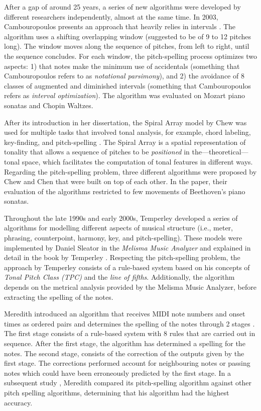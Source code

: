 After a gap of around 25 years, a series of new algorithms
were developed by different researchers independently,
almost at the same time. In 2003, Cambouropoulos presents an
approach that heavily relies in intervals
\cite{cambouropoulos2003pitch}. The algorithm uses a
shifting overlapping window (suggested to be of 9 to 12
pitches long). The window moves along the sequence of
pitches, from left to right, until the sequence concludes.
For each window, the pitch-spelling process optimizes two
aspects: 1) that notes make the minimum use of accidentals
(something that Cambouropoulos refers to as \emph{notational
parsimony}), and 2) the avoidance of 8 classes of augmented
and diminished intervals (something that Cambouropoulos
refers as \emph{interval optimization}). The algorithm was
evaluated on Mozart piano sonatas and Chopin Waltzes.

After its introduction in her dissertation, the Spiral Array
model by Chew was used for multiple tasks that involved
tonal analysis, for example, chord labeling, key-finding,
and pitch-spelling \cite{chew2000towards}. The Spiral Array
is a spatial representation of tonality that allows a
sequence of pitches to be \emph{positioned} in
the---theoretical---tonal space, which facilitates the
computation of tonal features in different ways. Regarding
the pitch-spelling problem, three different algorithms were
proposed by Chew and Chen \cite{chew2003determining} that
were built on top of each other. In the paper, their
evaluation of the algorithms restricted to few movements of
Beethoven's piano sonatas.

Throughout the late 1990s and early 2000s, Temperley
developed a series of algorithms for modelling different
aspects of musical structure (i.e., meter, phrasing,
counterpoint, harmony, key, and pitch-spelling). These
models were implemented by Daniel Sleator in the
\emph{Melisma Music Analyzer} and explained in detail in the
book by Temperley \cite{temperley2004cognition}. Respecting
the pitch-spelling problem, the approach by Temperley
consists of a rule-based system based on his concepts of
\emph{Tonal Pitch Class (TPC)} and the \emph{line of
fifths}. Additionally, the algorithm depends on the metrical
analysis provided by the Melisma Music Analyzer, before
extracting the spelling of the notes.

Meredith introduced an algorithm that receives MIDI note
numbers and onset times as ordered pairs and determines the
spelling of the notes through 2 stages
\cite{meredith2003pitch}. The first stage consists of a
rule-based system with 8 rules that are carried out in
sequence. After the first stage, the algorithm has
determined a spelling for the notes. The second stage,
consists of the correction of the outputs given by the first
stage. The corrections performed account for neighbouring
notes or passing notes which could have been erroneously
predicted by the first stage. In a subsequent study
\cite{meredith2005comparing}, Meredith compared its
pitch-spelling algorithm against other pitch spelling
algorithms, determining that his algorithm had the highest
accuracy.



